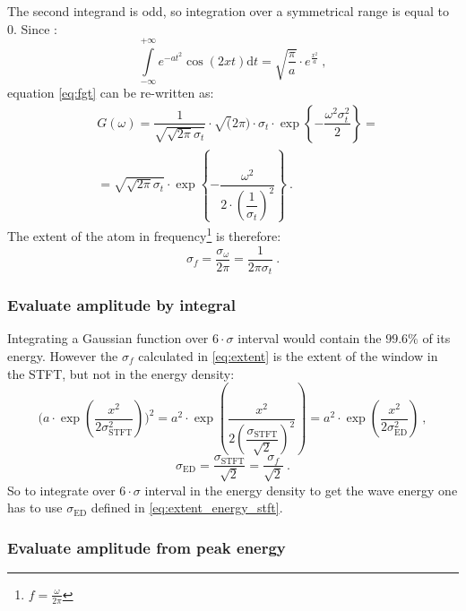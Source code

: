 \documentclass[a4paper,12pt,oneside]{article}
\newcommand{\dt}{\mathrm{d}t}
\begin{document}
The second integrand is odd, so integration over a symmetrical range is equal to 0. Since \cite{bronshtein07handbook}:
\begin{equation}\label{eq:first_int}
  \int\limits_{-\infty}^{+\infty} e^{-at^2} \cos(2xt) \dt = \sqrt{\dfrac{\pi}{a}} \cdot e^{\frac{x^2}{a}} \ ,
\end{equation}
equation \eqref{eq:fgt} can be re-written as:
\begin{eqnarray}\label{eq:second_int}
  & G(\omega) = \dfrac{1}{\sqrt{\sqrt{2\pi}\sigma_t}} \cdot \sqrt(2 \pi) \cdot \sigma_t \cdot \exp\left\{-\dfrac{\omega^2 \sigma_t^2}{2}\right\}  = \nonumber\\
  & = \sqrt{\sqrt{2\pi}\sigma_t} \cdot \exp\left\{-\dfrac{\omega^2}{2 \cdot \left( \dfrac{1}{\sigma_t} \right)^2}\right\} \ .
\end{eqnarray}
The extent of the atom in frequency\footnote{$f = \frac{\omega}{2\pi}$} is therefore:
\begin{equation}\label{eq:extent}
  \sigma_{f} = \dfrac{\sigma_{\omega}}{2 \pi} = \dfrac{1}{2 \pi \sigma_{t}} \ .
\end{equation}

\subsubsection{Evaluate amplitude by integral}

Integrating a Gaussian function over $6 \cdot \sigma$ interval would contain the $99.6 \%$ of its energy. However the $\sigma_{f}$ calculated in \eqref{eq:extent} is the extent of the window in the STFT, but not in the energy density:
\begin{equation}\label{eq:extent_energy}
  \Bigg( a \cdot \exp\left( \frac{x^2}{2\sigma_{\textrm{STFT}}^2} \right) \Bigg)^2 = 
  a^2 \cdot \exp\left( \frac{x^2}{2 \left( \dfrac{\sigma_{\textrm{STFT}}}{\sqrt{2}} \right)^2} \right) =
  a^2 \cdot \exp\left( \frac{x^2}{2 \sigma_{\textrm{ED}}^2} \right) \ ,
\end{equation}
\begin{equation}\label{eq:extent_energy_stft}
  \sigma_{\textrm{ED}} = \dfrac{\sigma_{\textrm{STFT}}}{\sqrt{2}}  = \dfrac{\sigma_f}{\sqrt{2}} \ .
\end{equation}
So to integrate over $6 \cdot \sigma$ interval in the energy density to get the wave energy one has to use $\sigma_{\textrm{ED}}$ defined in \eqref{eq:extent_energy_stft}.

\subsubsection{Evaluate amplitude from peak energy}
\end{document}
